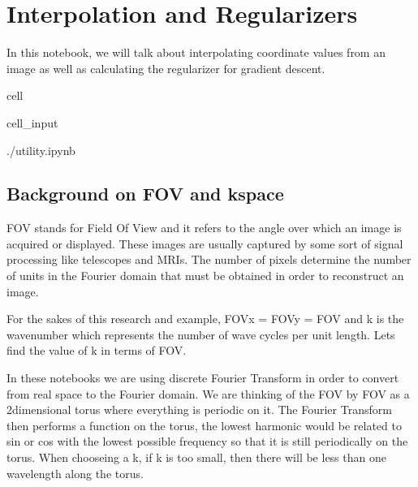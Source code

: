 \documentclass[letterpaper,10pt,english]{jupyterBook}
\begin{document}
\chapter{Interpolation and Regularizers}
\label{\detokenize{interpolation:interpolation-and-regularizers}}\label{\detokenize{interpolation::doc}}
\sphinxAtStartPar
In this notebook, we will talk about interpolating coordinate values from an image as well as calculating the regularizer
for gradient descent.

\begin{sphinxuseclass}{cell}\begin{sphinxVerbatimInput}

\begin{sphinxuseclass}{cell_input}
\begin{sphinxVerbatim}[commandchars=\\\{\}]
 ./utility.ipynb
\end{sphinxVerbatim}

\end{sphinxuseclass}\end{sphinxVerbatimInput}

\end{sphinxuseclass}

\section{Background on FOV and k\sphinxhyphen{}space}
\label{\detokenize{interpolation:background-on-fov-and-k-space}}
\sphinxAtStartPar
FOV stands for Field Of View and it refers to the angle over which an image is acquired or displayed. These images are usually captured by some sort of signal processing like telescopes and MRIs. The number of pixels determine the number of units in the Fourier domain that must be obtained in order to reconstruct an image.

\sphinxAtStartPar
For the sakes of this research and example, FOVx = FOVy = FOV and k is the wavenumber which represents the number of wave cycles per unit length. Lets find the value of k in terms of FOV.

\sphinxAtStartPar
In these notebooks we are using discrete Fourier Transform in order to convert from real space to the Fourier domain. We are thinking of the FOV by FOV as a 2\sphinxhyphen{}dimensional torus where everything is periodic on it. The Fourier Transform then performs a function on the torus, the lowest harmonic would be related to sin or cos with the lowest possible frequency so that it is still periodically on the torus. When chooseing a k, if k is too small, then there will be less than one wavelength along the torus.
\end{document}
